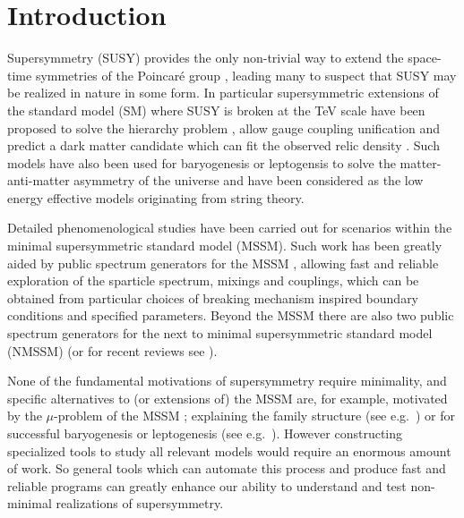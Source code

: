 \documentclass[final,3p,11pt,pdflatex]{elsarticle}
\begin{document}
\section{Introduction}
Supersymmetry (SUSY) provides the only non-trivial way to extend the
space-time symmetries of the Poincar\'e
group \cite{Coleman:1967ad,Haag:1974qh}, leading many to suspect that
SUSY may be realized in nature in some form. In particular
supersymmetric extensions of the standard model (SM) where SUSY is broken
at the TeV scale have been proposed to solve the hierarchy
problem \cite{Weinberg:1975gm, Weinberg:1979bn, Gildener:1976ai,
  Susskind:1978ms, 'tHooft:1980xb}, allow gauge coupling
unification \cite{Langacker:1990jh, Ellis:1990wk, Amaldi:1991cn,
  Langacker:1991an, Giunti:1991ta} and predict a dark matter candidate
which can fit the observed relic
density \cite{Goldberg:1983nd,Ellis:1983ew}.  Such models have also
been used for baryogenesis or leptogensis to solve the
matter-anti-matter asymmetry of the universe and have been considered
as the low energy effective models originating from string
theory.

Detailed phenomenological studies have been carried out for scenarios
within the minimal supersymmetric standard model (MSSM).  Such work
has been greatly aided by public spectrum generators for the MSSM
\cite{Allanach:2001kg,Porod:2003um,Djouadi:2002ze,Baer:1993ae,Chowdhury:2011zr},
allowing fast and reliable exploration of the sparticle spectrum,
mixings and couplings, which can be obtained from particular choices
of breaking mechanism inspired boundary conditions and specified
parameters. Beyond the MSSM there are also two public spectrum
generators \cite{Ellwanger:2006rn,Allanach:2013kza} for the next to
minimal supersymmetric standard model (NMSSM) \cite{NMSSM} (or for recent
reviews see \cite{Ellwanger:2009dp,Maniatis:2009re}).

None of the fundamental motivations of supersymmetry require
minimality, and specific alternatives to (or extensions of) the MSSM
are, for example, motivated by the $\mu$-problem of the MSSM
\cite{Kim:1983dt}; explaining the family structure (see
e.g.~\cite{King:2014nza}) or for successful baryogenesis or
leptogenesis (see e.g.~\cite{King:2008qb}). However constructing
specialized tools to study all relevant models would require an
enormous amount of work.  So general tools which can automate this
process and produce fast and reliable programs can greatly enhance our
ability to understand and test non-minimal realizations of
supersymmetry.
\end{document}
